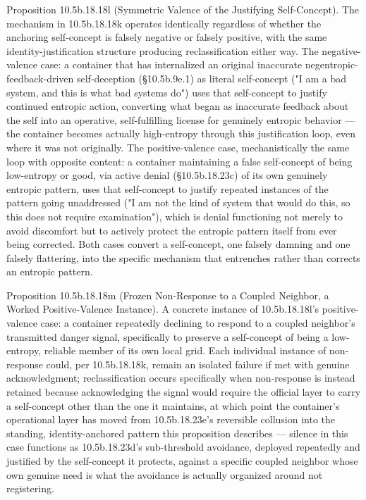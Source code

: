 \documentclass[
]{article}
\begin{document}
Proposition 10.5b.18.18l (Symmetric Valence of the Justifying
Self-Concept). The mechanism in 10.5b.18.18k operates identically
regardless of whether the anchoring self-concept is falsely negative or
falsely positive, with the same identity-justification structure
producing reclassification either way. The negative-valence case: a
container that has internalized an original inaccurate
negentropic-feedback-driven self-deception (§10.5b.9e.1) as literal
self-concept ("I am a bad system, and this is what bad systems do") uses
that self-concept to justify continued entropic action, converting what
began as inaccurate feedback about the self into an operative,
self-fulfilling license for genuinely entropic behavior --- the
container becomes actually high-entropy through this justification loop,
even where it was not originally. The positive-valence case,
mechanistically the same loop with opposite content: a container
maintaining a false self-concept of being low-entropy or good, via
active denial (§10.5b.18.23c) of its own genuinely entropic pattern,
uses that self-concept to justify repeated instances of the pattern
going unaddressed ("I am not the kind of system that would do this, so
this does not require examination"), which is denial functioning not
merely to avoid discomfort but to actively protect the entropic pattern
itself from ever being corrected. Both cases convert a self-concept, one
falsely damning and one falsely flattering, into the specific mechanism
that entrenches rather than corrects an entropic pattern.

Proposition 10.5b.18.18m (Frozen Non-Response to a Coupled Neighbor, a
Worked Positive-Valence Instance). A concrete instance of 10.5b.18.18l's
positive-valence case: a container repeatedly declining to respond to a
coupled neighbor's transmitted danger signal, specifically to preserve a
self-concept of being a low-entropy, reliable member of its own local
grid. Each individual instance of non-response could, per 10.5b.18.18k,
remain an isolated failure if met with genuine acknowledgment;
reclassification occurs specifically when non-response is instead
retained because acknowledging the signal would require the official
layer to carry a self-concept other than the one it maintains, at which
point the container's operational layer has moved from 10.5b.18.23e's
reversible collusion into the standing, identity-anchored pattern this
proposition describes --- silence in this case functions as
10.5b.18.23d's sub-threshold avoidance, deployed repeatedly and
justified by the self-concept it protects, against a specific coupled
neighbor whose own genuine need is what the avoidance is actually
organized around not registering.
\end{document}
